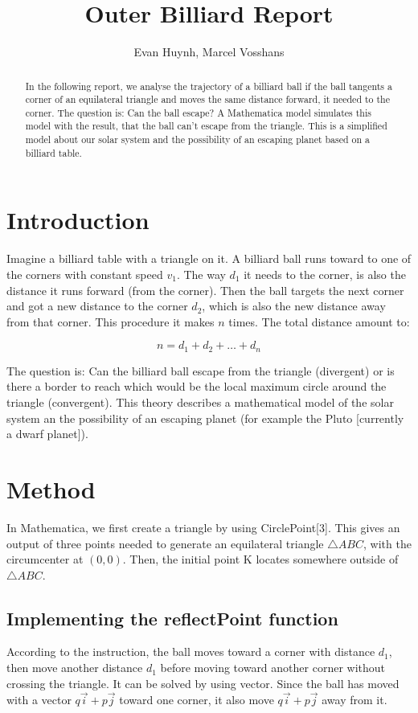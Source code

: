 \documentclass[11pt,a4paper]{article}
\begin{document}
\title{Outer Billiard Report}
\author{Evan Huynh, Marcel Vosshans}
\maketitle

\begin{abstract}
In the following report, we analyse the trajectory of a billiard ball if the ball tangents a corner of an equilateral triangle and moves the same distance forward, it needed to the corner. The question is: Can the ball escape? A Mathematica model simulates this model with the result, that the ball can't escape from the triangle. This is a simplified model about our solar system and the possibility of an escaping planet based on a billiard table.
\end{abstract}

\tableofcontents

\section{Introduction}
Imagine a billiard table with a triangle on it. A billiard ball runs toward to one of the corners with constant speed \(v_{1}\). The way \(d_{1}\) it needs to the corner, is also the distance it runs forward (from the corner). Then the ball targets the next corner and got a new distance to the corner \(d_{2}\), which is also the new distance away from that corner. This procedure it makes \(n\) times. The total distance amount to:

\[n=d_{1}+d_{2}+\dots+d_{n}\]

The question is: Can the billiard ball escape from the triangle (divergent) or is there a border to reach which would be the local maximum circle around the triangle (convergent). This theory describes a mathematical model of the solar system an the possibility of an escaping planet (for example the Pluto [currently a dwarf planet]).
	
\section{Method}
In Mathematica, we first create a triangle by using CirclePoint[3]. This gives an output of three points needed to generate an equilateral triangle \(\triangle ABC\), with the circumcenter at \((0,0)\). Then, the initial point K locates somewhere outside of \(\triangle ABC\).

\subsection{Implementing the reflectPoint function}
According to the instruction, the ball moves toward a corner with distance \(d_{1}\), then move another distance \(d_{1}\) before moving toward another corner without crossing the triangle. It can be solved by using vector. Since the ball has moved with a vector \( q\vec{i} + p\vec{j}\) toward one corner, it also move \( q\vec{i} + p\vec{j}\) away from it.
\end{document}
